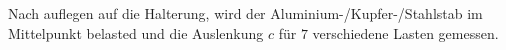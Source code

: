 \subsection{}

Nach auflegen auf die Halterung, wird der Aluminium-/Kupfer-/Stahlstab im Mittelpunkt belasted und die Auslenkung $c$ für $7$ verschiedene Lasten gemessen.
